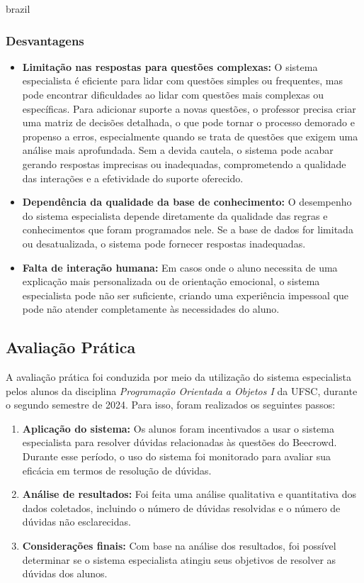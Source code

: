 \begin{otherlanguage*}{brazil}
\subsubsection{Desvantagens}
\begin{itemize}
	\item \textbf{Limitação nas respostas para questões complexas:} O sistema especialista é eficiente para lidar com questões simples ou frequentes, mas pode encontrar dificuldades ao lidar com questões mais complexas ou específicas. Para adicionar suporte a novas questões, o professor precisa criar uma matriz de decisões detalhada, o que pode tornar o processo demorado e propenso a erros, especialmente quando se trata de questões que exigem uma análise mais aprofundada. Sem a devida cautela, o sistema pode acabar gerando respostas imprecisas ou inadequadas, comprometendo a qualidade das interações e a efetividade do suporte oferecido.
    \item \textbf{Dependência da qualidade da base de conhecimento:} O desempenho do sistema especialista depende diretamente da qualidade das regras e conhecimentos que foram programados nele. Se a base de dados for limitada ou desatualizada, o sistema pode fornecer respostas inadequadas.
    \item \textbf{Falta de interação humana:} Em casos onde o aluno necessita de uma explicação mais personalizada ou de orientação emocional, o sistema especialista pode não ser suficiente, criando uma experiência impessoal que pode não atender completamente às necessidades do aluno.
\end{itemize}

\subsection{Avaliação Prática}

A avaliação prática foi conduzida por meio da utilização do sistema especialista pelos alunos da disciplina \textit{Programação Orientada a Objetos I} da UFSC, durante o segundo semestre de 2024. Para isso, foram realizados os seguintes passos:

\begin{enumerate}
    \item \textbf{Aplicação do sistema:} Os alunos foram incentivados a usar o sistema especialista para resolver dúvidas relacionadas às questões do Beecrowd. Durante esse período, o uso do sistema foi monitorado para avaliar sua eficácia em termos de resolução de dúvidas.
    \item \textbf{Análise de resultados:} Foi feita uma análise qualitativa e quantitativa dos dados coletados, incluindo o número de dúvidas resolvidas e o número de dúvidas não esclarecidas. 
    \item \textbf{Considerações finais:} Com base na análise dos resultados, foi possível determinar se o sistema especialista atingiu seus objetivos de resolver as dúvidas dos alunos.
\end{enumerate}


\end{otherlanguage*}
